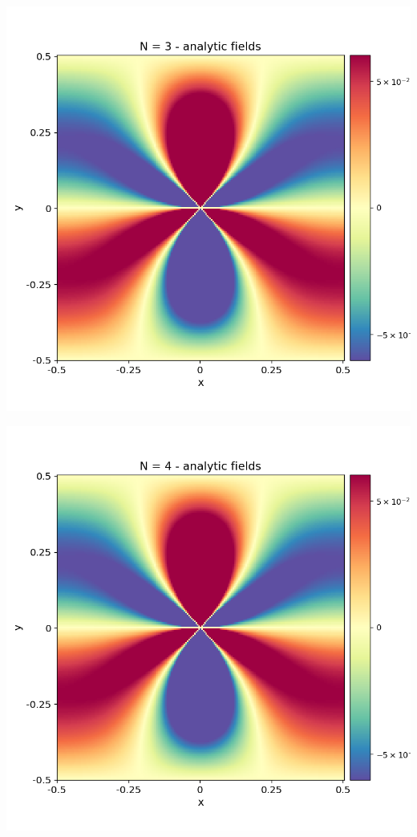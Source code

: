 \documentclass[12pt,a4paper]{article}
\theoremstyle{plain}
\begin{document}
\begin{minipage}{0.24\textwidth}
	\centering
	\includegraphics[width=\textwidth]{../stress_field_03.png}
\end{minipage}	
\begin{minipage}{0.24\textwidth}
	\centering
	\includegraphics[width=\textwidth]{../stress_field_04.png}
\end{minipage}	
\end{document}
